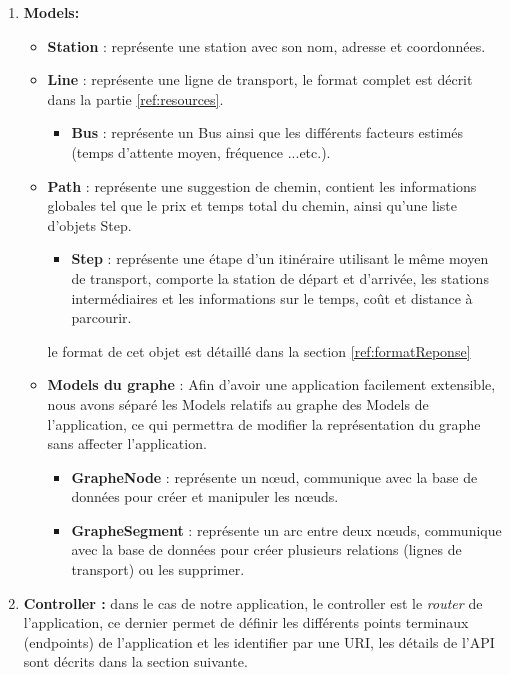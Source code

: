 \begin{enumerate}
	\item \textbf{Models:}
	      \begin{itemize}
	      	\item \textbf{Station} : représente une station avec son nom, adresse et coordonnées.
	      	\item \textbf{Line} : représente une ligne de transport, le format complet est décrit dans la partie \ref{ref:resources}.
	      	      \begin{itemize}
	      	      	\item \textbf{Bus} : représente un Bus ainsi que les différents facteurs estimés (temps d'attente moyen, fréquence ...etc.).
	      	      \end{itemize}
	      	\item \textbf{Path} : représente une suggestion de chemin, contient les informations globales tel que le prix et temps total du chemin, ainsi qu'une liste d'objets Step.
	      	      \begin{itemize}
	      	      	\item \textbf{Step} : représente une étape d'un itinéraire utilisant le même moyen de transport, comporte la station de départ et d'arrivée, les stations intermédiaires et les informations sur le temps, coût et distance à parcourir.
	      	      \end{itemize}
	      	      le format de cet objet est détaillé dans la section \ref{ref:formatReponse}
	      	\item \textbf{Models du graphe} : 
	      	      Afin d'avoir une application facilement extensible, nous avons séparé les Models relatifs au graphe des Models de l'application, ce qui permettra de modifier la représentation du graphe sans affecter l'application.
	      	      \begin{itemize}
	      	      	\item \textbf{GrapheNode} : représente un nœud, communique avec la base de données pour créer et manipuler les nœuds.
	      	      	\item \textbf{GrapheSegment} : représente un arc entre deux nœuds, communique avec la base de données pour créer plusieurs relations (lignes de transport) ou les supprimer.
	      	      \end{itemize}
	      \end{itemize}
	      	
	\item \textbf{Controller :} dans le cas de notre application, le controller est le \emph{router} de l'application, ce dernier permet de définir les différents points terminaux (endpoints) de l'application et les identifier par une URI, les détails de l'API sont décrits dans la section suivante.
	     	      	

\end{enumerate}
